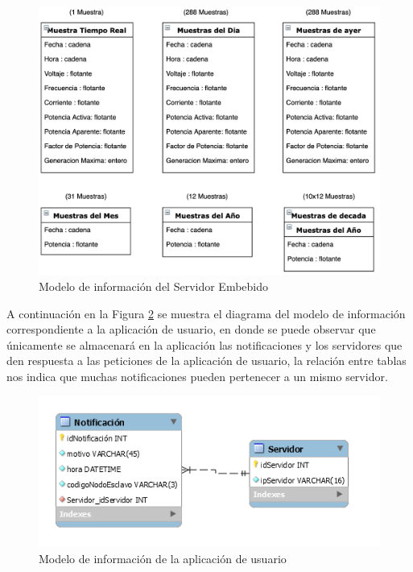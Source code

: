 \begin{figure}[H]
	\centering
	\includegraphics[scale=.30]{Capitulo4/images/Base_ServidorEmbebido.png}
	\caption{Modelo de información del Servidor Embebido}
	\label{fig:Base_ServidorEmbebido}
\end{figure}

A continuación en la Figura \ref{fig:Base_AplicacionUsuario} se muestra el diagrama del modelo de información correspondiente a la aplicación de usuario, en donde se puede observar que únicamente se almacenará en la aplicación las notificaciones y los servidores que den respuesta a las peticiones de la aplicación de usuario, la relación entre tablas nos indica que muchas notificaciones pueden pertenecer a un mismo servidor.

\begin{figure}[H]
	\centering
	\includegraphics[scale=1]{Capitulo4/images/Base_AplicacionUsuario.PNG}
	\caption{Modelo de información de la aplicación de usuario}
	\label{fig:Base_AplicacionUsuario}
\end{figure}